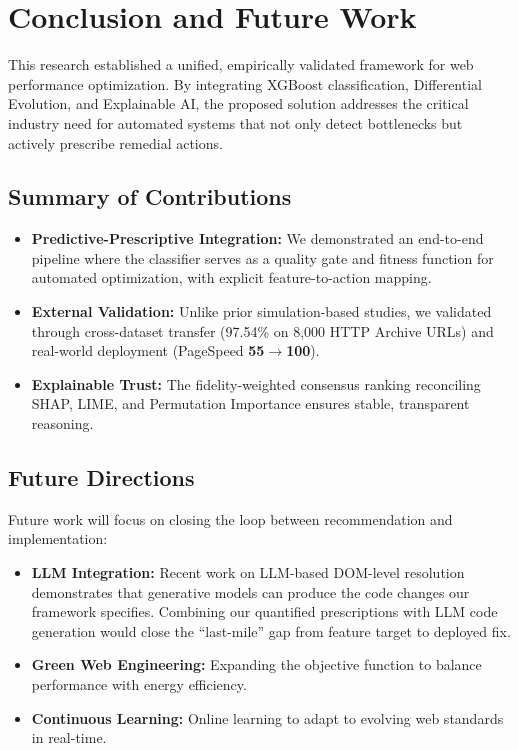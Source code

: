 \documentclass[conference]{IEEEtran}
\begin{document}
\section{Conclusion and Future Work}

This research established a unified, empirically validated framework for web performance optimization. By integrating XGBoost classification, Differential Evolution, and Explainable AI, the proposed solution addresses the critical industry need for automated systems that not only detect bottlenecks but actively prescribe remedial actions.

\subsection{Summary of Contributions}
\begin{itemize}
    \item \textbf{Predictive-Prescriptive Integration:} We demonstrated an end-to-end pipeline where the classifier serves as a quality gate and fitness function for automated optimization, with explicit feature-to-action mapping.
    \item \textbf{External Validation:} Unlike prior simulation-based studies, we validated through cross-dataset transfer (97.54\% on 8,000 HTTP Archive URLs) and real-world deployment (PageSpeed \textbf{55$\rightarrow$100}).
    \item \textbf{Explainable Trust:} The fidelity-weighted consensus ranking reconciling SHAP, LIME, and Permutation Importance ensures stable, transparent reasoning.
\end{itemize}

\subsection{Future Directions}
Future work will focus on closing the loop between recommendation and implementation:
\begin{itemize}
    \item \textbf{LLM Integration:} Recent work on LLM-based DOM-level resolution \cite{burg2026} demonstrates that generative models can produce the code changes our framework specifies. Combining our quantified prescriptions with LLM code generation would close the ``last-mile'' gap from feature target to deployed fix.
    \item \textbf{Green Web Engineering:} Expanding the objective function to balance performance with energy efficiency.
    \item \textbf{Continuous Learning:} Online learning to adapt to evolving web standards in real-time.
\end{itemize}
\end{document}
